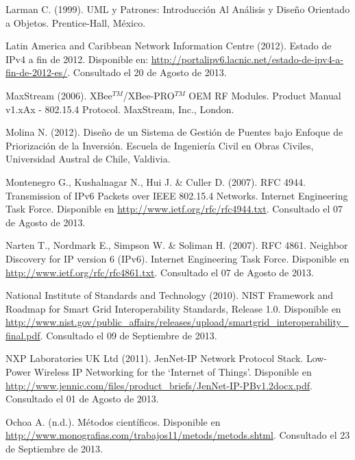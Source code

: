 \begin{spacing}{1.0}
\begin{thebibliography}{99}
Larman C. (1999).
\newblock UML y Patrones: Introducción Al Análisis y Diseño Orientado a Objetos.
\newblock Prentice-Hall, México.

Latin America and Caribbean Network Information Centre (2012).
\newblock Estado de IPv4 a fin de 2012.
\newblock Disponible en: \url{http://portalipv6.lacnic.net/estado-de-ipv4-a-fin-de-2012-es/}.
\newblock Consultado el 20 de Agosto de 2013.

MaxStream (2006).
\newblock XBee$^{TM}$/XBee-PRO$^{TM}$ OEM RF Modules. Product Manual v1.xAx - 802.15.4 Protocol.
\newblock MaxStream, Inc., London.

Molina N. (2012).
\newblock Diseño de un Sistema de Gestión de Puentes bajo Enfoque de Priorización de la Inversión.
\newblock Escuela de Ingeniería Civil en Obras Civiles,
\newblock Universidad Austral de Chile, Valdivia.

Montenegro G., Kushalnagar N., Hui J. \& Culler D. (2007).
\newblock RFC 4944. Transmission of IPv6 Packets over IEEE 802.15.4 Networks. Internet Engineering Task Force.
\newblock Disponible en \url{http://www.ietf.org/rfc/rfc4944.txt}.
\newblock Consultado el 07 de Agosto de 2013.

Narten T., Nordmark E., Simpson W. \& Soliman H. (2007).
\newblock RFC 4861. Neighbor Discovery for IP version 6 (IPv6). Internet Engineering Task Force.
\newblock Disponible en \url{http://www.ietf.org/rfc/rfc4861.txt}.
\newblock Consultado el 07 de Agosto de 2013.

National Institute of Standards and Technology (2010).
\newblock NIST Framework and Roadmap for Smart Grid Interoperability Standards, Release 1.0.
\newblock Disponible en \url{http://www.nist.gov/public_affairs/releases/upload/smartgrid_interoperability_final.pdf}.
\newblock Consultado el 09 de Septiembre de 2013.

NXP Laboratories UK  Ltd  (2011). 
\newblock JenNet-IP Network Protocol Stack. Low-Power Wireless IP Networking for the `Internet of Things'.
\newblock Disponible en \url{http://www.jennic.com/files/product_briefs/JenNet-IP-PBv1.2docx.pdf}.
\newblock Consultado el 01 de Agosto de 2013.

Ochoa A. (n.d.).
\newblock Métodos científicos.
\newblock Disponible en \url{http://www.monografias.com/trabajos11/metods/metods.shtml}.
\newblock Consultado el 23 de Septiembre de 2013.


\end{thebibliography}
\end{spacing}
